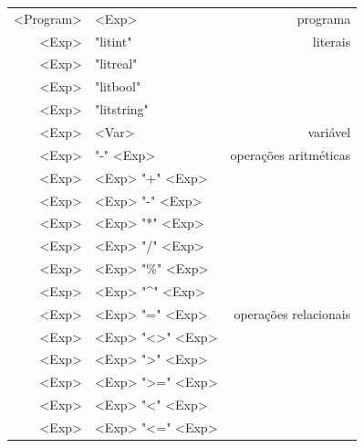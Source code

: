 \documentclass[a4paper,11pt,brazil]{article}
\begin{document}
  \begin{synshorts}
    \small
    \noindent
    \begin{longtable}{r@{$\;\rightarrow\;$}lr}
      <Program>    & <Exp>                                               & programa                \\[.9em]
      <Exp>        & "litint"                                            & literais                \\
      <Exp>        & "litreal"                                           &                         \\
      <Exp>        & "litbool"                                           &                         \\

      <Exp>        & "litstring"                                         &                         \\[.9em]

      <Exp>        & <Var>                                               & variável                \\[.9em]

      <Exp>        & "-" <Exp>                                           & operações aritméticas   \\
      <Exp>        & <Exp> "+" <Exp>                                     &                         \\
      <Exp>        & <Exp> "-" <Exp>                                     &                         \\
      <Exp>        & <Exp> "*" <Exp>                                     &                         \\
      <Exp>        & <Exp> "/" <Exp>                                     &                         \\
      <Exp>        & <Exp> "\%" <Exp>                                    &                         \\
      <Exp>        & <Exp> "^" <Exp>                                     &                         \\[.9em]

      <Exp>        & <Exp> "=" <Exp>                                     & operações relacionais   \\
      <Exp>        & <Exp> "<>" <Exp>                                    &                         \\
      <Exp>        & <Exp> ">" <Exp>                                     &                         \\
      <Exp>        & <Exp> ">=" <Exp>                                    &                         \\
      <Exp>        & <Exp> "<" <Exp>                                     &                         \\
      <Exp>        & <Exp> "<=" <Exp>                                    &                         \\[.9em]


\end{longtable}
\end{synshorts}
\end{document}
